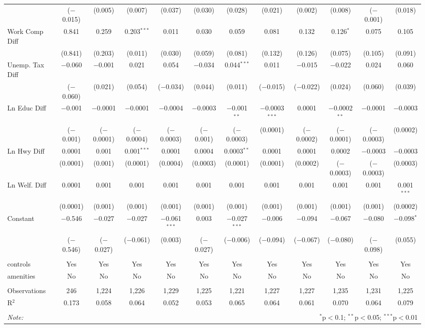 \begin{table}[!htbp]
\begin{tabular}{@{\extracolsep{5pt}}lccccccccccc}
  & ($-$0.015) & (0.005) & (0.007) & (0.037) & (0.030) & (0.028) & (0.021) & (0.002) & (0.008) & ($-$0.001) & (0.018) \\ 
  Work Comp Diff & 0.841 & 0.259 & 0.203$^{***}$ & 0.011 & 0.030 & 0.059 & 0.081 & 0.132 & 0.126$^{*}$ & 0.075 & 0.105 \\ 
  & (0.841) & (0.203) & (0.011) & (0.030) & (0.059) & (0.081) & (0.132) & (0.126) & (0.075) & (0.105) & (0.091) \\ 
  Unemp. Tax Diff & $-$0.060 & $-$0.001 & 0.021 & 0.054 & $-$0.034 & 0.044$^{***}$ & 0.011 & $-$0.015 & $-$0.022 & 0.024 & 0.060 \\ 
  & ($-$0.060) & (0.021) & (0.054) & ($-$0.034) & (0.044) & (0.011) & ($-$0.015) & ($-$0.022) & (0.024) & (0.060) & (0.039) \\ 
  Ln Educ Diff & $-$0.001 & $-$0.0001 & $-$0.0001 & $-$0.0004 & $-$0.0003 & $-$0.001$^{**}$ & $-$0.0003$^{***}$ & 0.0001 & $-$0.0002$^{**}$ & $-$0.0001 & $-$0.0003 \\ 
  & ($-$0.001) & ($-$0.0001) & ($-$0.0004) & ($-$0.0003) & ($-$0.001) & ($-$0.0003) & (0.0001) & ($-$0.0002) & ($-$0.0001) & ($-$0.0003) & (0.0002) \\ 
  Ln Hwy Diff & 0.0001 & 0.001 & 0.001$^{***}$ & 0.0001 & 0.0004 & 0.0003$^{**}$ & 0.0001 & 0.0001 & 0.0002 & $-$0.0003 & $-$0.0003 \\ 
  & (0.0001) & (0.001) & (0.0001) & (0.0004) & (0.0003) & (0.0001) & (0.0001) & (0.0002) & ($-$0.0003) & ($-$0.0003) & (0.0003) \\ 
  Ln Welf. Diff & 0.0001 & 0.001 & 0.001 & 0.001 & 0.001 & 0.001 & 0.001 & 0.001 & 0.001 & 0.001 & 0.001$^{***}$ \\ 
  & (0.0001) & (0.001) & (0.001) & (0.001) & (0.001) & (0.001) & (0.001) & (0.001) & (0.001) & (0.001) & (0.0002) \\ 
  Constant & $-$0.546 & $-$0.027 & $-$0.027 & $-$0.061$^{***}$ & 0.003 & $-$0.027$^{***}$ & $-$0.006 & $-$0.094 & $-$0.067 & $-$0.080 & $-$0.098$^{*}$ \\ 
  & ($-$0.546) & ($-$0.027) & ($-$0.061) & (0.003) & ($-$0.027) & ($-$0.006) & ($-$0.094) & ($-$0.067) & ($-$0.080) & ($-$0.098) & (0.055) \\ 
 \hline \\[-1.8ex] 
controls & Yes & Yes & Yes & Yes & Yes & Yes & Yes & Yes & Yes & Yes & Yes \\ 
amenities & No & No & No & No & No & No & No & No & No & No & No \\ 
\hline \\[-1.8ex] 
Observations & 246 & 1,224 & 1,226 & 1,229 & 1,225 & 1,221 & 1,227 & 1,227 & 1,235 & 1,231 & 1,225 \\ 
R$^{2}$ & 0.173 & 0.058 & 0.064 & 0.052 & 0.053 & 0.065 & 0.064 & 0.061 & 0.070 & 0.064 & 0.079 \\ 
\hline 
\hline \\[-1.8ex] 
\textit{Note:}  & \multicolumn{11}{r}{$^{*}$p$<$0.1; $^{**}$p$<$0.05; $^{***}$p$<$0.01} \\ 
\end{tabular} 
\end{table} 
